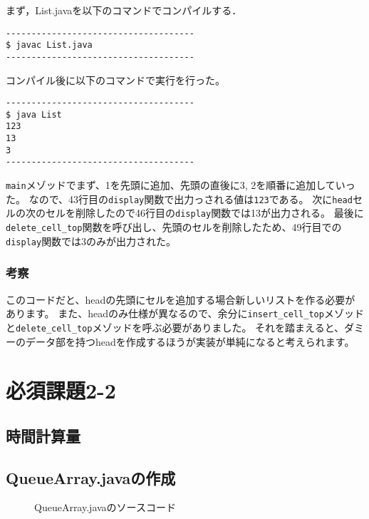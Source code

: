 \documentclass[10.5pt,a4paper]{jsarticle}
\begin{document}
まず，List.javaを以下のコマンドでコンパイルする．
\begin{verbatim}
-------------------------------------
$ javac List.java
-------------------------------------
\end{verbatim}
コンパイル後に以下のコマンドで実行を行った。
\begin{verbatim}
-------------------------------------
$ java List
123
13
3
-------------------------------------
\end{verbatim}

\texttt{main}メゾッドでまず、1を先頭に追加、先頭の直後に3, 2を順番に追加していった。
なので、43行目の\texttt{display}関数で出力っされる値は\texttt{123}である。
次に\texttt{head}セルの次のセルを削除したので46行目の\texttt{display}関数では13が出力される。
最後に\texttt{delete\_cell\_top}関数を呼び出し、先頭のセルを削除したため、49行目での\texttt{display}関数では3のみが出力された。

\subsubsection{考察}

このコードだと、headの先頭にセルを追加する場合新しいリストを作る必要があります。
また、headのみ仕様が異なるので、余分に\texttt{insert\_cell\_top}メゾッドと\texttt{delete\_cell\_top}メゾッドを呼ぶ必要がありました。
それを踏まえると、ダミーのデータ部を持つheadを作成するほうが実装が単純になると考えられます。

\section{必須課題2-2}

\subsection{時間計算量}

\subsection{QueueArray.javaの作成}

\begin{figure}[t]
  \begin{center}
   
   \caption{QueueArray.javaのソースコード}
   \label{code:QueueArray}
  \end{center}
 \end{figure}
\end{document}
